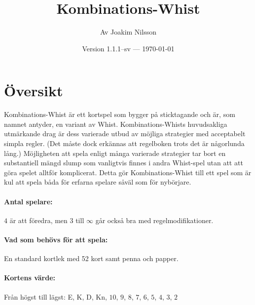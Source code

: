 \documentclass[a4paper]{article}
\title{Kombinations-Whist}
\author{Av Joakim Nilsson}
\date{Version 1.1.1--sv --- \today}
\begin{document}
	\introPages

	\section{Översikt}{%
		Kombinations-Whist är ett kortspel som bygger på sticktagande och är, som namnet antyder, en variant av Whist. Kombinations-Whists huvudsakliga utmärkande drag är dess varierade utbud av möjliga strategier med acceptabelt simpla regler. (Det måste dock erkännas att regelboken trots det är någorlunda lång.) Möjligheten att spela enligt många varierade strategier tar bort en substantiell mängd slump som vanligtvis finnes i andra Whist-spel utan att att göra spelet alltför komplicerat. Detta gör Kombinations-Whist till ett spel som är kul att spela båda för erfarna spelare såväl som för nybörjare.

		\paragraph{Antal spelare:}
		$4$ är att föredra, men $3$ till $\infty$ går också bra med regelmodifikationer.

		\paragraph{Vad som behövs för att spela:}
		En standard kortlek med 52 kort samt penna och papper.

		\paragraph{Kortens värde:}
		Från högst till lägst: E, K, D, Kn, $10$, $9$, $8$, $7$, $6$, $5$, $4$, $3$, $2$
	}
\end{document}
